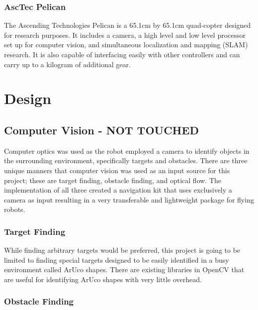 \documentclass{article}
\begin{document}
		\subsubsection{AscTec Pelican}
		
		The Ascending Technologies Pelican is a 65.1cm by 65.1cm quad-copter designed for research purposes\cite{asctec}. It includes a camera, a high level and low level processor set up for computer vision, and simultaneous localization and mapping (SLAM) research. It is also capable of interfacing easily with other controllers and can carry up to a kilogram of additional gear.






		
\section{Design}
	
	\subsection{Computer Vision - NOT TOUCHED}
	
	Computer optics was used as the robot employed a camera to identify objects in the surrounding environment, specifically targets and obstacles. There are three unique manners that computer vision was used as an input source for this project; these are target finding, obstacle finding, and optical flow. The implementation of all three created a navigation kit that uses exclusively a camera as input resulting in a very transferable and lightweight package for flying robots.
	
		\subsubsection{Target Finding}
		
		While finding arbitrary targets would be preferred, this project is going to be limited to finding special targets designed to be easily identified in a busy environment called ArUco shapes. There are existing libraries in OpenCV that are useful for identifying ArUco shapes with very little overhead. 
		
		\subsubsection{Obstacle Finding}
		
\end{document}
